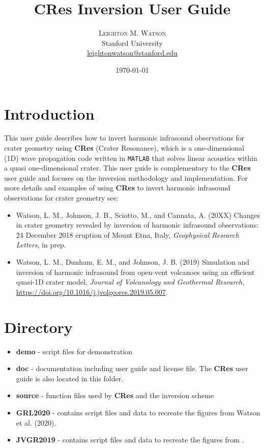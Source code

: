 \documentclass[10pt]{article}
\title{CRes Inversion User Guide} %
\author{%
\textsc{Leighton M. Watson} \\%
\normalsize Stanford University \\ %
\normalsize \href{mailto:leightonwatson@stanford.edu}{leightonwatson@stanford.edu} %
}
\date{\today} %
\begin{document}
\maketitle


\section{Introduction}
This user guide describes how to invert harmonic infrasound observations for crater geometry using {\bf CRes} (Crater Resonance), which is a one-dimensional (1D) wave propagation code written in \texttt{MATLAB} that solves linear acoustics within a quasi one-dimensional crater. This user guide is complementary to the {\bf CRes} user guide and focuses on the inversion methodology and implementation. For more details and examples of using {\bf CRes} to invert harmonic infrasound observations for crater geometry see:
\begin{itemize}
\item Watson, L. M., Johnson, J. B., Sciotto, M., and Cannata, A. (20XX) Changes in crater geometry revealed by inversion of harmonic infrasound observations: 24 December 2018 eruption of Mount Etna, Italy, \emph{Geophysical Research Letters}, in prep.
\item Watson, L. M., Dunham, E. M., and Johnson, J. B. (2019) Simulation and inversion of harmonic infrasound from open-vent volcanoes using an efficient quasi-1D crater model, \emph{Journal of Volcanology and Geothermal Research}, \href{https://doi.org/10.1016/j.jvolgeores.2019.05.007}{https://doi.org/10.1016/j.jvolgeores.2019.05.007}.
\end{itemize}

\section{Directory}
\begin{itemize}
\item {\bf demo} - script files for demonstration
\item {\bf doc} - documentation including user guide and license file. The {\bf CRes} user guide is also located in this folder.
\item{\bf source} - function files used by {\bf CRes} and the inversion scheme
\item {\bf GRL2020} - contains script files and data to recreate the figures from Watson et al. (2020).
\item {\bf JVGR2019} - contains script files and data to recreate the figures from \cite{Watson2019_infrasonic_resonance}.
\end{itemize}
\end{document}
